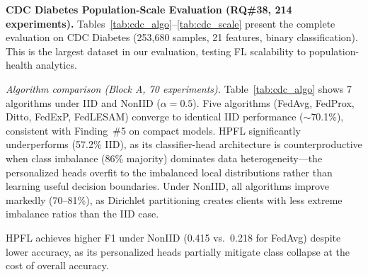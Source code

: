 \documentclass[conference,a4paper]{IEEEtran}
\begin{document}
\smallskip\noindent\textbf{CDC Diabetes Population-Scale Evaluation (RQ\#38, 214 experiments).}
\label{sec:cdc}
Tables~\ref{tab:cdc_algo}--\ref{tab:cdc_scale} present the complete evaluation on CDC Diabetes (253,680 samples, 21 features, binary classification). This is the largest dataset in our evaluation, testing FL scalability to population-health analytics.

\smallskip\noindent\textit{Algorithm comparison (Block A, 70 experiments).} Table~\ref{tab:cdc_algo} shows 7 algorithms under IID and NonIID ($\alpha{=}0.5$). Five algorithms (FedAvg, FedProx, Ditto, FedExP, FedLESAM) converge to identical IID performance ($\sim$70.1\%), consistent with Finding~\#5 on compact models. HPFL significantly underperforms (57.2\% IID), as its classifier-head architecture is counterproductive when class imbalance (86\% majority) dominates data heterogeneity---the personalized heads overfit to the imbalanced local distributions rather than learning useful decision boundaries. Under NonIID, all algorithms improve markedly (70--81\%), as Dirichlet partitioning creates clients with less extreme imbalance ratios than the IID case.

\begin{table}[htbp]
\centering
\caption{CDC Diabetes: Algorithm Comparison (Block A, 70 exp.). $K{=}5$, 20 rounds, 3 local epochs, no DP. Mean $\pm$ std over 5 seeds.}
\label{tab:cdc_algo}
\par{\footnotesize HPFL achieves higher F1 under NonIID (0.415 vs.\ 0.218 for FedAvg) despite lower accuracy, as its personalized heads partially mitigate class collapse at the cost of overall accuracy.}
\end{table}
\end{document}
